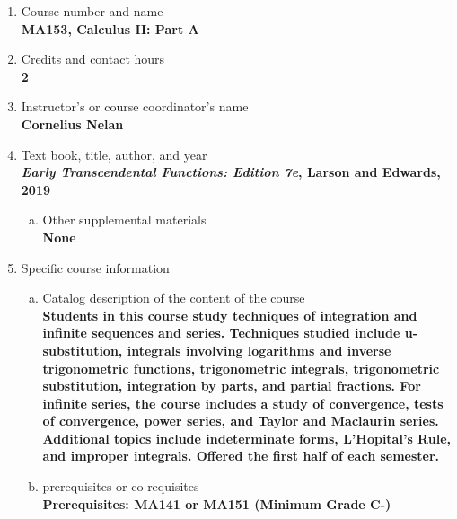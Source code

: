 \label{MA153}  %
\begin{enumerate}[1.]
\item Course number and name\\
  {\bfseries
    MA153, Calculus II: Part A
  }
  
\item Credits and contact hours\\
  {\bfseries
    2  %
  }

\item Instructor's or course coordinator's name\\
  {\bfseries
    Cornelius Nelan    
  }

\item Text book, title, author, and year\\
  {\bfseries
    {\em Early Transcendental Functions: Edition 7e}, Larson and Edwards, 2019
  }
\begin{enumerate}[a.]
\item Other supplemental materials\\
  {\bfseries
    None    
  }
\end{enumerate}

\item Specific course information
\begin{enumerate}[a.]  
\item Catalog description of the content of the course\\
  {\bfseries
Students in this course study techniques of integration and infinite sequences and series. Techniques studied include u-substitution, integrals involving logarithms and inverse trigonometric functions, trigonometric integrals, trigonometric substitution, integration by parts, and partial fractions. For infinite series, the course includes a study of convergence, tests of convergence, power series, and Taylor and Maclaurin series. Additional topics include indeterminate forms, L'Hopital's Rule, and improper integrals. Offered the first half of each semester.    
  }

\item prerequisites or co-requisites\\
  {\bfseries
    Prerequisites: MA141 or MA151 (Minimum Grade C-) %
  }


\end{enumerate}
\end{enumerate}
